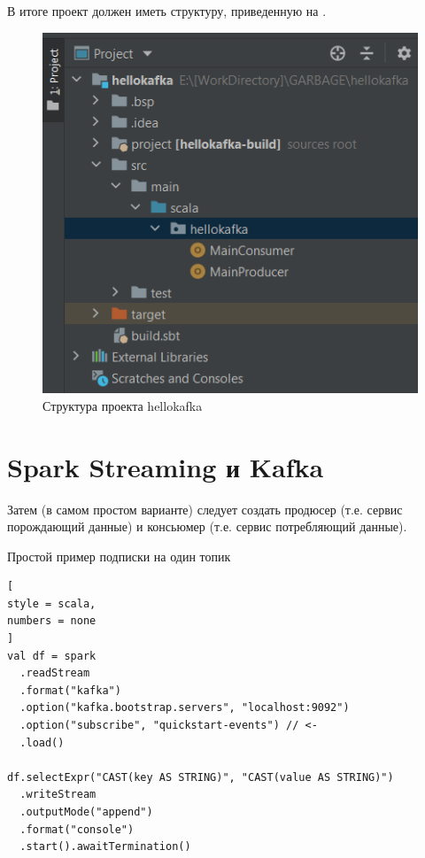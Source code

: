 \documentclass[%
	11pt,
	a4paper,
	utf8,
		]{article}
\begin{document}
В итоге проект должен иметь структуру, приведенную на .

\begin{figure}[h]
	\centering
	\includegraphics[scale=0.95]{figures/idea_kafka_scala_schema.png}
	\caption{ Структура проекта hellokafka }\label{fig:idea_kafka_scala_schema}
\end{figure}







\section{Spark Streaming и Kafka}


Затем (в самом простом варианте) следует создать продюсер (т.е. сервис порождающий данные) и консьюмер (т.е. сервис потребляющий данные).

Простой пример подписки на один топик
\begin{lstlisting}[
style = scala,
numbers = none	
]
val df = spark
  .readStream
  .format("kafka")
  .option("kafka.bootstrap.servers", "localhost:9092")
  .option("subscribe", "quickstart-events") // <-
  .load()
  
df.selectExpr("CAST(key AS STRING)", "CAST(value AS STRING)")
  .writeStream
  .outputMode("append")
  .format("console")
  .start().awaitTermination()
\end{lstlisting}
\end{document}

